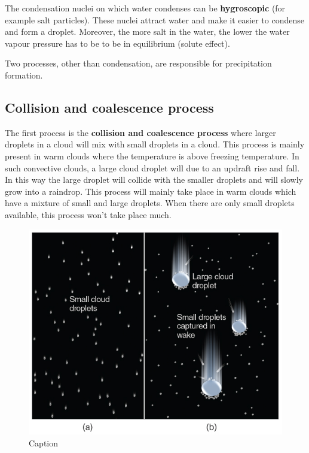 \documentclass[12pt,oneside]{book}
\begin{document}
The condensation nuclei on which water condenses can be
\textbf{hygroscopic} (for example salt particles). These nuclei attract
water and make it easier to condense and form a droplet. Moreover, the
more salt in the water, the lower the water vapour pressure has to be to
be in equilibrium (solute effect).

Two processes, other than condensation, are responsible for
precipitation formation.

\subsection{Collision and coalescence
process}\label{collision-and-coalescence-process}

The first process is the \textbf{collision and coalescence process}
where larger droplets in a cloud will mix with small droplets in a
cloud. This process is mainly present in warm clouds where the
temperature is above freezing temperature. In such convective clouds, a
large cloud droplet will due to an updraft rise and fall. In this way
the large droplet will collide with the smaller droplets and will slowly
grow into a raindrop. This process will mainly take place in warm clouds
which have a mixture of small and large droplets. When there are only
small droplets available, this process won't take place much.

\begin{figure}

{\centering \includegraphics[width=0.9\linewidth]{figures/Figure327} 

}

\caption{Caption}\label{fig:Collision}
\end{figure}
\end{document}

